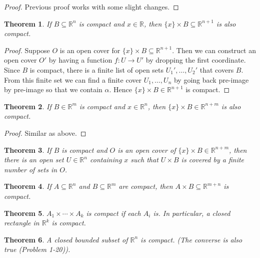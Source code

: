 \documentclass[12pt]{book}
\newtheorem{theorem}{Theorem}
\begin{document}
\begin{proof}
  Previous proof works with some slight changes. 
\end{proof}

\begin{theorem}
If $B \subseteq \mathbb{R}^{n}$ is compact and $x \in \mathbb{R}$, then $\{x\}\times
B \subseteq \mathbb{R}^{n+1}$ is also compact.
\end{theorem}
\begin{proof}
Suppose $O$ is an open cover for $\{x\}\times B \subseteq \mathbb{R}^{n+1}$. Then we
can construct an open cover $O'$ by having a function $f:U \to U'$ by dropping
the first coordinate. Since $B$ is compact, there is a finite list of open sets
$U_1', \ldots, U_2'$ that covers $B$. From this finite set we can find a finite
cover $U_1, \ldots, U_n$ by going back pre-image by pre-image so that we contain
$\alpha$. Hence $\{x\}\times B \in \mathbb{R}^{n+1}$ is compact.
\end{proof}


\begin{theorem}
If $B \in \mathbb{R}^{m}$ is compact and $x \in \mathbb{R}^n$, then $\{x\}\times
B \in \mathbb{R}^{n+m}$ is also compact.
\end{theorem}

\begin{proof}
  Similar as above. 
\end{proof}

\begin{theorem}
If $B$ is compact and $O$ is an open cover of $\{x\}\times B \in
\mathbb{R}^{n+m}$, then there is an open set $U\in \mathbb{R}^n$ containing $x$
such that $U \times B$ is covered by a finite number of sets in $O$.
\end{theorem}

\begin{theorem}
  If $A \subseteq \mathbb{R}^n$  and $B \subseteq \mathbb{R}^m$  are compact, then $A \times B \subseteq \mathbb{R}^{m+n}$ is compact. 
\end{theorem}

\begin{theorem}
  $A_1 \times \cdots \times A_k$ is compact if each $A_i$ is. In particular, a closed rectangle in $\mathbb{R}^k$ is compact. 
\end{theorem}

\begin{theorem}
  A closed bounded subset of $\mathbb{R}^n$ is compact. (The converse is also true (Problem 1-20)).
\end{theorem}
\end{document}
